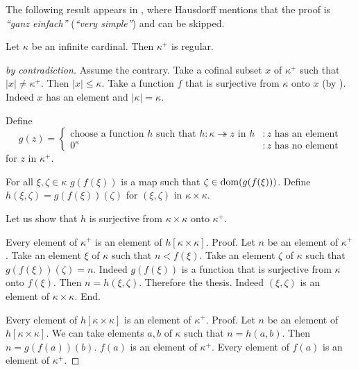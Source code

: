 \documentclass{article}
\newcommand{\surjects}{\twoheadrightarrow}
\begin{document}
  The following result appears in \cite[p.~443]{Hausdorff1908},
  where Hausdorff mentions that the proof is
  \textit{``ganz einfach''} (\textit{``very simple''}) and can be skipped.

  \begin{forthel}
    \begin{theorem}[Hausdorff]
      Let $\kappa$ be an infinite cardinal.
      Then $\kappa^{+}$ is regular.
    \end{theorem}
    \begin{proof}[by contradiction]
      Assume the contrary.
      Take a cofinal subset $x$ of $\kappa^{+}$ such that $|x| \neq \kappa^{+}$.
      Then $|x| \leq \kappa$.
      Take a function $f$ that is surjective from $\kappa$ onto $x$ (by
      ).
      Indeed $x$ has an element and $|\kappa| = \kappa$.

      Define \[ g(z) =
        \begin{cases}
          \text{choose a function $h$ such that $h : \kappa \surjects z$ in $h$}
          & : \text{$z$ has an element}
          \\
          \text{$0^{\kappa}$}
          & : \text{$z$ has no element}
        \end{cases}
      \] for $z$ in $\kappa^{+}$.

      For all $\xi, \zeta \in \kappa$ $g(f(\xi))$ is a map such that $\zeta \in
      \operatorname{dom}(g(f(\xi)))$.
      Define $h(\xi,\zeta) = g(f(\xi))(\zeta)$ for $(\xi,\zeta)$ in $\kappa
      \times \kappa$.

      Let us show that $h$ is surjective from $\kappa \times \kappa$ onto
      $\kappa^{+}$.

        Every element of $\kappa^{+}$ is an element of $h[\kappa \times
        \kappa]$. \newline
        Proof.
          Let $n$ be an element of $\kappa^{+}$.
          Take an element $\xi$ of $\kappa$ such that $n < f(\xi)$.
          Take an element $\zeta$ of $\kappa$ such that $g(f(\xi))(\zeta) = n$.
          Indeed $g(f(\xi))$ is a function that is surjective from $\kappa$ onto
          $f(\xi)$.
          Then $n = h(\xi,\zeta)$.
          Therefore the thesis.
          Indeed $(\xi,\zeta)$ is an element of $\kappa \times \kappa$.
        End.

        Every element of $h[\kappa \times \kappa]$ is an element of
        $\kappa^{+}$. \newline
        Proof.
          Let $n$ be an element of $h[\kappa \times \kappa]$.
          We can take elements $a, b$ of $\kappa$ such that $n = h(a,b)$.
          Then $n = g(f(a))(b)$.
          $f(a)$ is an element of $\kappa^{+}$.
          Every element of $f(a)$ is an element of $\kappa^{+}$.


\end{proof}
\end{forthel}
\end{document}
